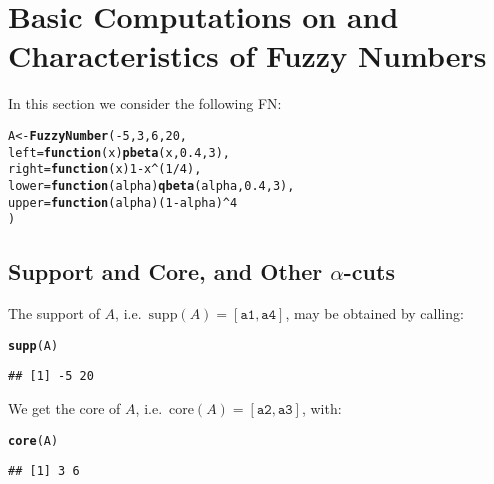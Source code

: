 \documentclass[11pt]{article}\usepackage{graphicx, color}
\makeatletter
\newcommand{\hlfunctioncall}[1]{\textcolor[rgb]{0.501960784313725,0,0.329411764705882}{\textbf{#1}}}%
\newenvironment{kframe}{%
 \def\at@end@of@kframe{}%
 \ifinner\ifhmode%
  \def\at@end@of@kframe{\end{minipage}}%
  \begin{minipage}{\columnwidth}%
 \fi\fi%
 \def\FrameCommand##1{\hskip\@totalleftmargin \hskip-\fboxsep
 \colorbox{shadecolor}{##1}\hskip-\fboxsep
     \hskip-\linewidth \hskip-\@totalleftmargin \hskip\columnwidth}%
 \MakeFramed {\advance\hsize-\width
   \@totalleftmargin\z@ \linewidth\hsize
   \@setminipage}}%
 {\par\unskip\endMakeFramed%
 \at@end@of@kframe}
\newenvironment{knitrout}{}{} %
\makeatother
\begin{document}



\section{Basic Computations on and Characteristics of Fuzzy Numbers}


In this section we consider the following FN:

\begin{knitrout}\small
{}\color{fgcolor}\begin{kframe}
\begin{alltt}
A <- \hlfunctioncall{FuzzyNumber}(-5, 3, 6, 20,
    left=\hlfunctioncall{function}(x) \hlfunctioncall{pbeta}(x,0.4,3),
   right=\hlfunctioncall{function}(x) 1-x^(1/4),
   lower=\hlfunctioncall{function}(alpha) \hlfunctioncall{qbeta}(alpha,0.4,3),
   upper=\hlfunctioncall{function}(alpha) (1-alpha)^4
)
\end{alltt}
\end{kframe}
\end{knitrout}



\subsection{Support and Core, and Other $\alpha$-cuts}

The support of $A$, i.e.~$\mathrm{supp}(A)=[\mathtt{a1}, \mathtt{a4}]$,
may be obtained by calling:

\begin{knitrout}\small
{}\color{fgcolor}\begin{kframe}
\begin{alltt}
\hlfunctioncall{supp}(A)
\end{alltt}
\begin{verbatim}
## [1] -5 20
\end{verbatim}
\end{kframe}
\end{knitrout}


\noindent
We get the core of $A$, i.e.~$\mathrm{core}(A)=[\mathtt{a2}, \mathtt{a3}]$,
with:

\begin{knitrout}\small
{}\color{fgcolor}\begin{kframe}
\begin{alltt}
\hlfunctioncall{core}(A)
\end{alltt}
\begin{verbatim}
## [1] 3 6
\end{verbatim}
\end{kframe}
\end{knitrout}
\end{document}
